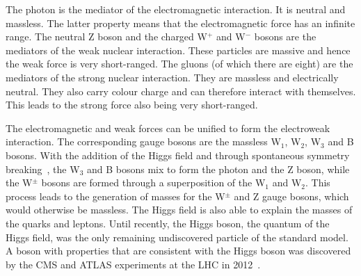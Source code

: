 The photon is the mediator of the electromagnetic interaction. It is neutral 
and massless. The latter property means that the electromagnetic force has an 
infinite range. The neutral Z boson and the charged W$^{+}$ and W$^{-}$ bosons 
are the mediators of the weak nuclear interaction. These particles are massive 
and hence the weak force is very short-ranged. The gluons (of which there are 
eight) are the mediators of the strong nuclear interaction. They are massless 
and electrically neutral. They also carry colour charge and can therefore 
interact with themselves. This leads to the strong force also being very 
short-ranged.

The electromagnetic and weak forces can be unified to form the electroweak 
interaction. The corresponding gauge bosons are the massless W$_1$, W$_2$, 
W$_3$ and B bosons. With the addition of the Higgs field and through 
spontaneous symmetry breaking~\cite{higgsmech1,higgsmech2,higgsmech3}, the 
W$_3$ and B bosons mix to form the photon 
and the Z boson, while the W$^{\pm}$ bosons are formed through a superposition 
of the W$_1$ and W$_2$. This process leads to the generation of masses for the 
W$^{\pm}$ and Z gauge bosons, which would otherwise be massless. The Higgs 
field is also able to explain the masses of the quarks and leptons. 
Until recently, the Higgs boson, the quantum of the Higgs field, was the only 
remaining undiscovered particle of the standard model. A boson with properties 
that are consistent with the Higgs boson was discovered by the CMS and ATLAS 
experiments at the LHC in 2012~\cite{higgs-cms,higgs-atlas}.

